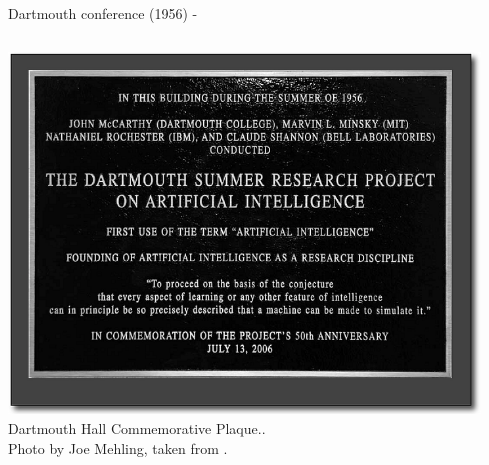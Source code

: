 \begin{frame}[t,allowframebreaks]{Dartmouth conference (1956) -}
    \begin{columns}
        \begin{column}{0.30\textwidth}
            \begin{center}
            \includegraphics[width=0.98\textwidth]{./images/misc/dartmouth_commemorative_plaque.png}\\
            { \scriptsize 
            \vspace{0.1cm}
            Dartmouth Hall Commemorative Plaque..\\
            \color{col:attribution} 
            Photo by Joe Mehling, taken from \cite{Veisdal:2019dartmouth}.\\}
            \end{center}
        \end{column}
        \begin{column}{0.70\textwidth}
        \end{column}
    \end{columns}

\end{frame}